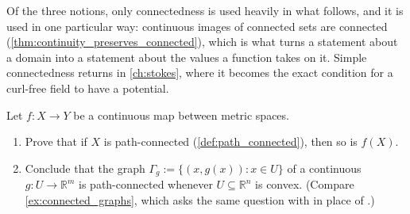 Of the three notions, only connectedness is used heavily in what follows, and it is used in one
particular way: continuous images of connected sets are connected
(\cref{thm:continuity_preserves_connected}), which is what turns a statement about a domain into a
statement about the values a function takes on it. Simple connectedness returns in
\cref{ch:stokes}, where it becomes the exact condition for a curl-free field to have a potential.




\begin{aiexercise}
\label{ex:ai_connected_image}
Let $f \colon X \to Y$ be a continuous map between metric spaces.
\begin{enumerate}[label=\textbf{(\alph*)}]
  \item Prove that if $X$ is path-connected (\cref{def:path_connected}), then so is $f(X)$.
  \item Conclude that the graph $\Gamma_g := \{(x,g(x)) : x \in U\}$ of a continuous
    $g : U \to \mathbb{R}^m$ is path-connected whenever $U \subseteq \mathbb{R}^n$ is convex.
    (Compare \cref{ex:connected_graphs}, which asks the same question with  in place
    of .)
\end{enumerate}
\end{aiexercise}



